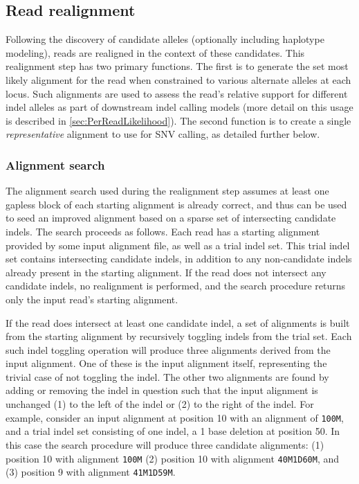 \documentclass{article}
\begin{document}
\fi %


\subsection{Read realignment}
\label{sec:realignment}

Following the discovery of candidate alleles (optionally including haplotype modeling), reads are realigned in the context of these candidates. This realignment step has two primary functions. The first is to generate the set most likely alignment for the read when constrained to various alternate alleles at each locus. Such alignments are used to assess the read's relative support for different indel alleles as part of downstream indel calling models (more detail on this usage is described in \ref{sec:PerReadLikelihood}). The second function is to create a single \textit{representative} alignment to use for SNV calling, as detailed further below.

\subsubsection{Alignment search}
The alignment search used during the realignment step assumes at least one gapless block of each starting alignment is already correct, and thus can be used to seed an improved alignment based on a sparse set of intersecting candidate indels. The search proceeds as follows. Each read has a starting alignment provided by some input alignment file, as well as a trial indel set. This trial indel set contains intersecting candidate indels, in addition to any non-candidate indels already present in the starting alignment. If the read does not intersect any candidate indels, no realignment is performed, and the search procedure returns only the input read's starting alignment.

If the read does intersect at least one candidate indel, a set of alignments is built from the starting alignment by recursively toggling indels from the trial set. Each such indel toggling operation will produce three alignments derived from the input alignment. One of these is the input alignment itself, representing the trivial case of not toggling the indel. The other two alignments are found by adding or removing the indel in question such that the input alignment is unchanged (1) to the left of the indel or (2) to the right of the indel. For example, consider an input alignment at position 10 with an alignment of \texttt{100M}, and a trial indel set consisting of one indel, a 1 base deletion at position 50. In this case the search procedure will produce three candidate alignments: (1) position 10 with alignment \texttt{100M} (2) position 10 with alignment \texttt{40M1D60M}, and (3) position 9 with alignment \texttt{41M1D59M}.
\end{document}
